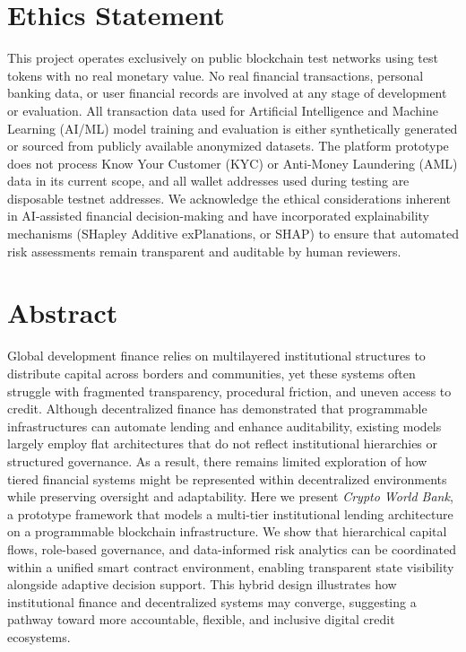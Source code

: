 \documentclass[12pt,a4paper]{report}
\begin{document}
\newpage
\thispagestyle{empty}

\chapter*{Ethics Statement}

This project operates exclusively on public blockchain test networks using test tokens with no real monetary value. No real financial transactions, personal banking data, or user financial records are involved at any stage of development or evaluation. All transaction data used for Artificial Intelligence and Machine Learning (AI/ML) model training and evaluation is either synthetically generated or sourced from publicly available anonymized datasets. The platform prototype does not process Know Your Customer (KYC) or Anti-Money Laundering (AML) data in its current scope, and all wallet addresses used during testing are disposable testnet addresses. We acknowledge the ethical considerations inherent in AI-assisted financial decision-making and have incorporated explainability mechanisms (SHapley Additive exPlanations, or SHAP) to ensure that automated risk assessments remain transparent and auditable by human reviewers.

\newpage
\thispagestyle{empty}

\chapter*{Abstract}

Global development finance relies on multilayered institutional structures to distribute capital across borders and communities, yet these systems often struggle with fragmented transparency, procedural friction, and uneven access to credit. Although decentralized finance has demonstrated that programmable infrastructures can automate lending and enhance auditability, existing models largely employ flat architectures that do not reflect institutional hierarchies or structured governance. As a result, there remains limited exploration of how tiered financial systems might be represented within decentralized environments while preserving oversight and adaptability. Here we present \textit{Crypto World Bank}, a prototype framework that models a multi-tier institutional lending architecture on a programmable blockchain infrastructure. We show that hierarchical capital flows, role-based governance, and data-informed risk analytics can be coordinated within a unified smart contract environment, enabling transparent state visibility alongside adaptive decision support. This hybrid design illustrates how institutional finance and decentralized systems may converge, suggesting a pathway toward more accountable, flexible, and inclusive digital credit ecosystems.
\end{document}
